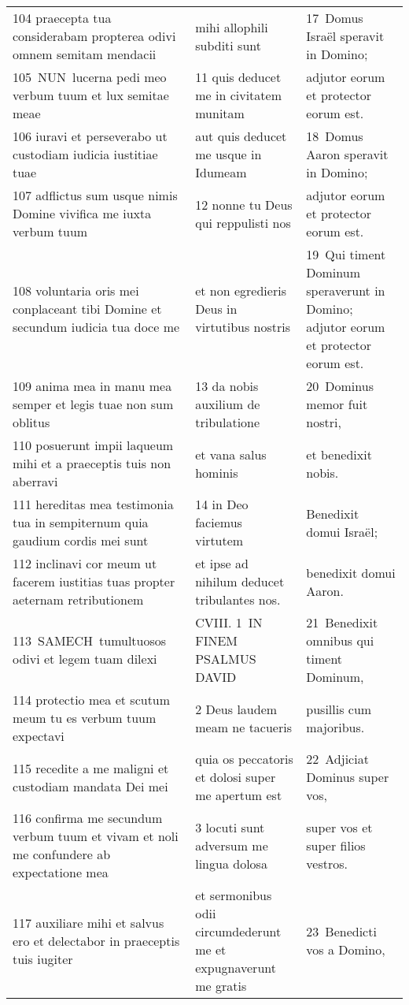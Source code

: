 \documentclass{article}
\begin{document}
\begin{longtable}{@{}p{}p{}p{}@{}}
104 praecepta tua considerabam propterea odivi omnem semitam mendacii	&	mihi allophili subditi sunt	&	17 Domus Israël speravit in Domino;	\\
105 NUN lucerna pedi meo verbum tuum et lux semitae meae	&	11 quis deducet me in civitatem munitam	&	adjutor eorum et protector eorum est.	\\
106 iuravi et perseverabo ut custodiam iudicia iustitiae tuae	&	aut quis deducet me usque in Idumeam	&	18 Domus Aaron speravit in Domino;	\\
107 adflictus sum usque nimis Domine vivifica me iuxta verbum tuum	&	12 nonne tu Deus qui reppulisti nos	&	adjutor eorum et protector eorum est.	\\
108 voluntaria oris mei conplaceant tibi Domine et secundum iudicia tua doce me	&	et non egredieris Deus in virtutibus nostris	&	19 Qui timent Dominum speraverunt in Domino; adjutor eorum et protector eorum est.	\\
109 anima mea in manu mea semper et legis tuae non sum oblitus	&	13 da nobis auxilium de tribulatione	&	20 Dominus memor fuit nostri,	\\
110 posuerunt impii laqueum mihi et a praeceptis tuis non aberravi	&	et vana salus hominis	&	et benedixit nobis.	\\
111 hereditas mea testimonia tua in sempiternum quia gaudium cordis mei sunt	&	14 in Deo faciemus virtutem	&	Benedixit domui Israël;	\\
112 inclinavi cor meum ut facerem iustitias tuas propter aeternam retributionem	&	et ipse ad nihilum deducet tribulantes nos.	&	benedixit domui Aaron.	\\
113 SAMECH tumultuosos odivi et legem tuam dilexi	&	CVIII. 1 IN FINEM PSALMUS DAVID	&	21 Benedixit omnibus qui timent Dominum,	\\
114 protectio mea et scutum meum tu es verbum tuum expectavi	&	2 Deus laudem meam ne tacueris	&	pusillis cum majoribus.	\\
115 recedite a me maligni et custodiam mandata Dei mei	&	quia os peccatoris et dolosi super me apertum est	&	22 Adjiciat Dominus super vos,	\\
116 confirma me secundum verbum tuum et vivam et noli me confundere ab expectatione mea	&	3 locuti sunt adversum me lingua dolosa	&	super vos et super filios vestros.	\\
117 auxiliare mihi et salvus ero et delectabor in praeceptis tuis iugiter	&	et sermonibus odii circumdederunt me et expugnaverunt me gratis	&	23 Benedicti vos a Domino,	\\

\end{longtable}
\end{document}
